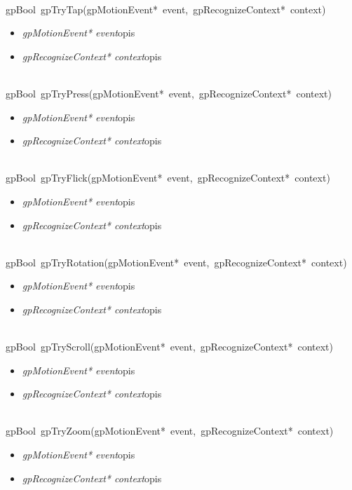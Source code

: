  \ \\
\mbox{\textsf{gpBool gpTryTap(gpMotionEvent* event, gpRecognizeContext* context)}}
	\begin{itemize}
		\item \textit{gpMotionEvent* event}\quad opis
		\item \textit{gpRecognizeContext* context}\quad opis
	\end{itemize}

 \ \\
\mbox{\textsf{gpBool gpTryPress(gpMotionEvent* event, gpRecognizeContext* context)}}
	\begin{itemize}
		\item \textit{gpMotionEvent* event}\quad opis
		\item \textit{gpRecognizeContext* context}\quad opis
	\end{itemize}

 \ \\
\mbox{\textsf{gpBool gpTryFlick(gpMotionEvent* event, gpRecognizeContext* context)}}
	\begin{itemize}
		\item \textit{gpMotionEvent* event}\quad opis
		\item \textit{gpRecognizeContext* context}\quad opis
	\end{itemize}

 \ \\
\mbox{\textsf{gpBool gpTryRotation(gpMotionEvent* event, gpRecognizeContext* context)}}
	\begin{itemize}
		\item \textit{gpMotionEvent* event}\quad opis
		\item \textit{gpRecognizeContext* context}\quad opis
	\end{itemize}

 \ \\
\mbox{\textsf{gpBool gpTryScroll(gpMotionEvent* event, gpRecognizeContext* context)}}
	\begin{itemize}
		\item \textit{gpMotionEvent* event}\quad opis
		\item \textit{gpRecognizeContext* context}\quad opis
	\end{itemize}

 \ \\
\mbox{\textsf{gpBool gpTryZoom(gpMotionEvent* event, gpRecognizeContext* context)}}
	\begin{itemize}
		\item \textit{gpMotionEvent* event}\quad opis
		\item \textit{gpRecognizeContext* context}\quad opis
	\end{itemize}

